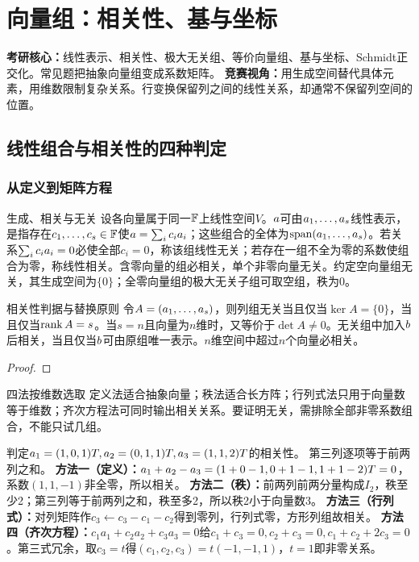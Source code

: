\chapter{向量组：相关性、基与坐标}\label{ch:vectors}
\begin{examtip}
\textbf{考研核心：}线性表示、相关性、极大无关组、等价向量组、基与坐标、Schmidt正交化。常见题把抽象向量组变成系数矩阵。
\textbf{竞赛视角：}用生成空间替代具体元素，用维数限制复杂关系。行变换保留列之间的线性关系，却通常不保留列空间的位置。
\end{examtip}
\section{线性组合与相关性的四种判定}
\subsection{从定义到矩阵方程}
\begin{definition}{生成、相关与无关}
设各向量属于同一$\mathbb{F}$上线性空间$V$。$a$可由$a_1,\ldots,a_s$线性表示，是指存在$c_1,\ldots,c_s\in\mathbb{F}$使$a=\sum_i c_ia_i$；这些组合的全体为$\operatorname{span}(a_1,\ldots,a_s)$。若关系$\sum_i c_ia_i=0$必使全部$c_i=0$，称该组线性无关；若存在一组不全为零的系数使组合为零，称线性相关。含零向量的组必相关，单个非零向量无关。约定空向量组无关，其生成空间为$\{0\}$；全零向量组的极大无关子组可取空组，秩为0。
\end{definition}
\begin{theorem}{相关性判据与替换原则}
令$A=(a_1,\ldots,a_s)$，则列组无关当且仅当$\ker A=\{0\}$，当且仅当$\operatorname{rank} A=s$。当$s=n$且向量为$n$维时，又等价于$\det A\ne0$。无关组中加入$b$后相关，当且仅当$b$可由原组唯一表示。$n$维空间中超过$n$个向量必相关。
\end{theorem}
\begin{proof}

\end{proof}
\begin{method}{四法按维数选取}
定义法适合抽象向量；秩法适合长方阵；行列式法只用于向量数等于维数；齐次方程法可同时输出相关关系。要证明无关，需排除全部非零系数组合，不能只试几组。
\end{method}
{判定$a_1=(1,0,1)T,a_2=(0,1,1)T,a_3=(1,1,2)T$的相关性。}
{第三列逐项等于前两列之和。}
{\textbf{方法一（定义）：}$a_1+a_2-a_3=(1+0-1,0+1-1,1+1-2)T=0$，系数$(1,1,-1)$非全零，所以相关。
\textbf{方法二（秩）：}前两列前两分量构成$I_2$，秩至少2；第三列等于前两列之和，秩至多2，所以秩2小于向量数3。
\textbf{方法三（行列式）：}对列矩阵作$c_3\leftarrow c_3-c_1-c_2$得到零列，行列式零，方形列组故相关。
\textbf{方法四（齐次方程）：}$c_1a_1+c_2a_2+c_3a_3=0$给$c_1+c_3=0,c_2+c_3=0,c_1+c_2+2c_3=0$。第三式冗余，取$c_3=t$得$(c_1,c_2,c_3)=t(-1,-1,1)$，$t=1$即非零关系。}
